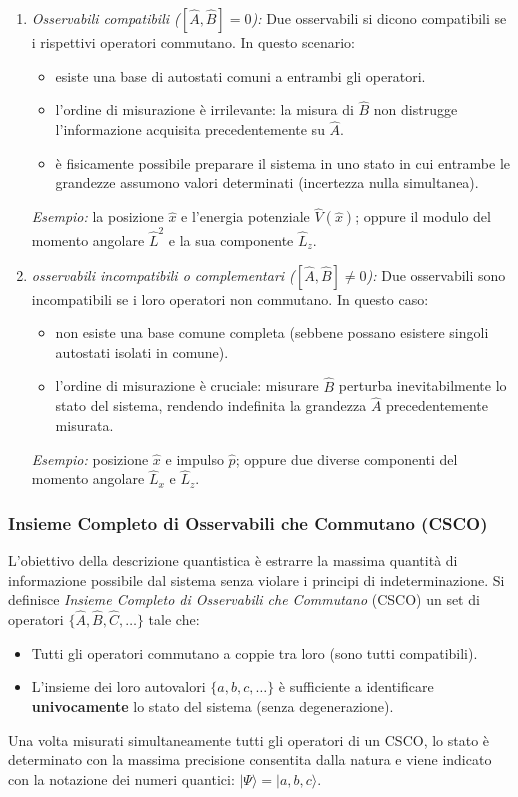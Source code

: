 \documentclass[a4paper,11pt]{report}
\begin{document}
\begin{enumerate}
    \item \textit{Osservabili compatibili ($[\hat{A}, \hat{B}] = 0$):}
    Due osservabili si dicono compatibili se i rispettivi operatori commutano.
    In questo scenario:
    \begin{itemize}
        \item esiste una base di autostati comuni a entrambi gli operatori.
        \item l'ordine di misurazione è irrilevante: la misura di $\hat{B}$ non distrugge l'informazione acquisita precedentemente su $\hat{A}$.
        \item è fisicamente possibile preparare il sistema in uno stato in cui entrambe le grandezze assumono valori determinati (incertezza nulla simultanea).
    \end{itemize}
    \textit{Esempio:} la posizione $\hat{x}$ e l'energia potenziale $\hat{V}(\hat{x})$; oppure il modulo del momento angolare $\hat{L}^2$ e la sua componente $\hat{L}_z$.

    \item \textit{osservabili incompatibili o complementari ($[\hat{A}, \hat{B}] \neq 0$):}
    Due osservabili sono incompatibili se i loro operatori non commutano.
    In questo caso:
    \begin{itemize}
        \item non esiste una base comune completa (sebbene possano esistere singoli autostati isolati in comune).
        \item l'ordine di misurazione è cruciale: misurare $\hat{B}$ perturba inevitabilmente lo stato del sistema, rendendo indefinita la grandezza $\hat{A}$ precedentemente misurata.
            \end{itemize}
    \textit{Esempio:} posizione $\hat{x}$ e impulso $\hat{p}$; oppure due diverse componenti del momento angolare $\hat{L}_x$ e $\hat{L}_z$.
\end{enumerate}

\subsubsection{Insieme Completo di Osservabili che Commutano (CSCO)}
L'obiettivo della descrizione quantistica è estrarre la massima quantità di informazione possibile dal sistema senza violare i principi di indeterminazione.
Si definisce \textit{Insieme Completo di Osservabili che Commutano} (CSCO) un set di operatori $\{\hat{A}, \hat{B}, \hat{C}, \dots\}$ tale che:
\begin{itemize}
    \item Tutti gli operatori commutano a coppie tra loro (sono tutti compatibili).
    \item L'insieme dei loro autovalori $\{a, b, c, \dots\}$ è sufficiente a identificare \textbf{univocamente} lo stato del sistema (senza degenerazione).
\end{itemize}
Una volta misurati simultaneamente tutti gli operatori di un CSCO, lo stato è determinato con la massima precisione consentita dalla natura e viene indicato con la notazione dei numeri quantici: $|\Psi\rangle = |a, b, c\rangle$.
\end{document}
